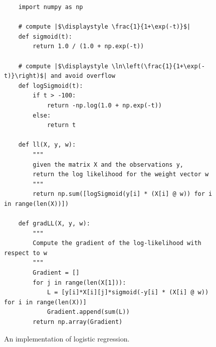 \begin{figure}[!ht]
\centering

\begin{verbatim}
    import numpy as np
  
    # compute |$\displaystyle \frac{1}{1+\exp(-t)}$|
    def sigmoid(t):
        return 1.0 / (1.0 + np.exp(-t))
  
    # compute |$\displaystyle \ln\left(\frac{1}{1+\exp(-t)}\right)$| and avoid overflow
    def logSigmoid(t):
        if t > -100:
            return -np.log(1.0 + np.exp(-t))
        else:
            return t
  
    def ll(X, y, w):
        """
        given the matrix X and the observations y,
        return the log likelihood for the weight vector w
        """
        return np.sum([logSigmoid(y[i] * (X[i] @ w)) for i in range(len(X))])
  
    def gradLL(X, y, w):
        """
        Compute the gradient of the log-likelihood with respect to w 
        """
        Gradient = []
        for j in range(len(X[1])):
            L = [y[i]*X[i][j]*sigmoid(-y[i] * (X[i] @ w)) for i in range(len(X))]
            Gradient.append(sum(L))
        return np.array(Gradient)
\end{verbatim}

\caption{An implementation of logistic regression.}
\label{fig:logistic_regression.py}
\end{figure}
\FloatBarrier


